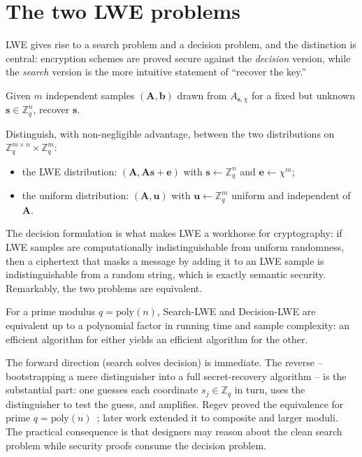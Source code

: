 \section{The two LWE problems}

LWE gives rise to a search problem and a decision problem, and the distinction is central: encryption schemes are proved secure against the \emph{decision} version, while the \emph{search} version is the more intuitive statement of ``recover the key.''

\begin{definition}
Given $m$ independent samples $(\mathbf{A},\mathbf{b})$ drawn from $A_{\mathbf{s},\chi}$ for a fixed but unknown $\mathbf{s}\in\mathbb{Z}_q^{n}$, recover $\mathbf{s}$.
\end{definition}

\begin{definition}
Distinguish, with non-negligible advantage, between the two distributions on $\mathbb{Z}_q^{m\times n}\times\mathbb{Z}_q^{m}$:
\begin{itemize}
  \item the LWE distribution: $(\mathbf{A},\mathbf{A}\mathbf{s}+\mathbf{e})$ with $\mathbf{s}\leftarrow\mathbb{Z}_q^{n}$ and $\mathbf{e}\leftarrow\chi^{m}$;
  \item the uniform distribution: $(\mathbf{A},\mathbf{u})$ with $\mathbf{u}\leftarrow\mathbb{Z}_q^{m}$ uniform and independent of $\mathbf{A}$.
\end{itemize}
\end{definition}

The decision formulation is what makes LWE a workhorse for cryptography: if LWE samples are computationally indistinguishable from uniform randomness, then a ciphertext that masks a message by adding it to an LWE sample is indistinguishable from a random string, which is exactly semantic security. Remarkably, the two problems are equivalent.

\begin{proposition}
\label{prop:search-decision}
For a prime modulus $q=\mathrm{poly}(n)$, Search-LWE and Decision-LWE are equivalent up to a polynomial factor in running time and sample complexity: an efficient algorithm for either yields an efficient algorithm for the other.
\end{proposition}

The forward direction (search solves decision) is immediate. The reverse -- bootstrapping a mere distinguisher into a full secret-recovery algorithm -- is the substantial part: one guesses each coordinate $s_j\in\mathbb{Z}_q$ in turn, uses the distinguisher to test the guess, and amplifies. Regev proved the equivalence for prime $q=\mathrm{poly}(n)$~\cite{regev2009}; later work extended it to composite and larger moduli. The practical consequence is that designers may reason about the clean search problem while security proofs consume the decision problem.


